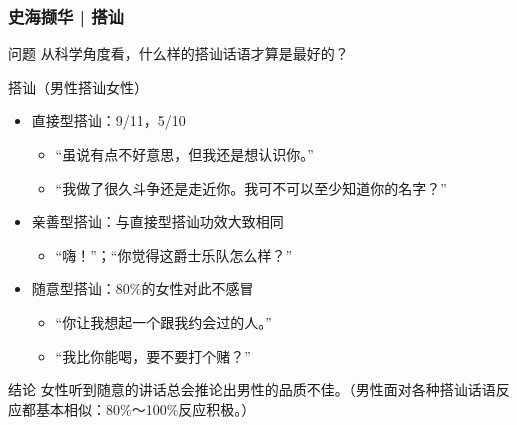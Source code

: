 \begin{frame}
  \frametitle{史海撷华 | 搭讪}
  \vspace{-0.7em}
  \begin{block}{问题}
    从科学角度看，什么样的搭讪话语才算是最好的？
  \end{block}
  \vspace{-0.7em}
  \pause
  \begin{block}{搭讪（男性搭讪女性）}
    \begin{itemize}
      \item 直接型搭讪：9/11，5/10
        \begin{itemize}
          \item “虽说有点不好意思，但我还是想认识你。”
          \item “我做了很久斗争还是走近你。我可不可以至少知道你的名字？”
        \end{itemize}
      \item 亲善型搭讪：与直接型搭讪功效大致相同
        \begin{itemize}
          \item “嗨！”；“你觉得这爵士乐队怎么样？”
        \end{itemize}
      \item 随意型搭讪：80\%的女性对此不感冒
        \begin{itemize}
          \item “你让我想起一个跟我约会过的人。”
          \item “我比你能喝，要不要打个赌？”
        \end{itemize}
    \end{itemize}
  \end{block}
  \vspace{-0.7em}
  \pause
  \begin{block}{结论}
    女性听到随意的讲话总会推论出男性的品质不佳。（男性面对各种搭讪话语反应都基本相似：80\%～100\%反应积极。）
  \end{block}
\end{frame}

